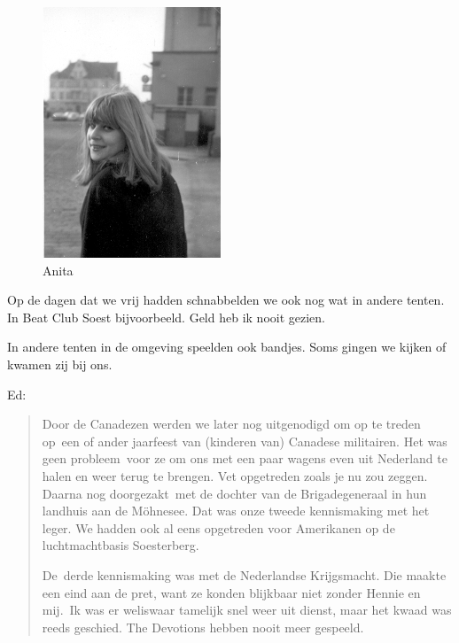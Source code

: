 \documentclass[12pt,twoside, openright]{memoir}
\begin{document}
\begin{figure}
\includegraphics[width=\textwidth]{img/ch29/Anita}
\caption*{\footnotesize Anita}
\end{figure}

Op de dagen dat we vrij hadden schnabbelden we ook nog wat in andere tenten. In Beat Club Soest bijvoorbeeld. Geld heb ik nooit gezien. 

In andere tenten in de omgeving speelden ook bandjes. Soms gingen we kijken of kwamen zij bij ons. 	

Ed:

\begin{quote}
Door de Canadezen werden we later nog uitgenodigd om op te treden op een of ander jaarfeest van (kinderen van) Canadese militairen. Het was geen probleem voor ze om ons met een paar wagens even uit Nederland te halen en weer terug te brengen. Vet opgetreden zoals je nu zou zeggen. Daarna nog doorgezakt met de dochter van de Brigadegeneraal in hun landhuis aan de Möhnesee. Dat was onze tweede kennismaking met het leger. We hadden ook al eens opgetreden voor Amerikanen op de luchtmachtbasis Soesterberg. 

De derde kennismaking was met de Nederlandse Krijgsmacht. Die maakte een eind aan de pret, want ze konden blijkbaar niet zonder Hennie en mij. Ik was er weliswaar tamelijk snel weer uit dienst, maar het kwaad was reeds geschied. The Devotions hebben nooit meer gespeeld.
\end{quote}
\end{document}
